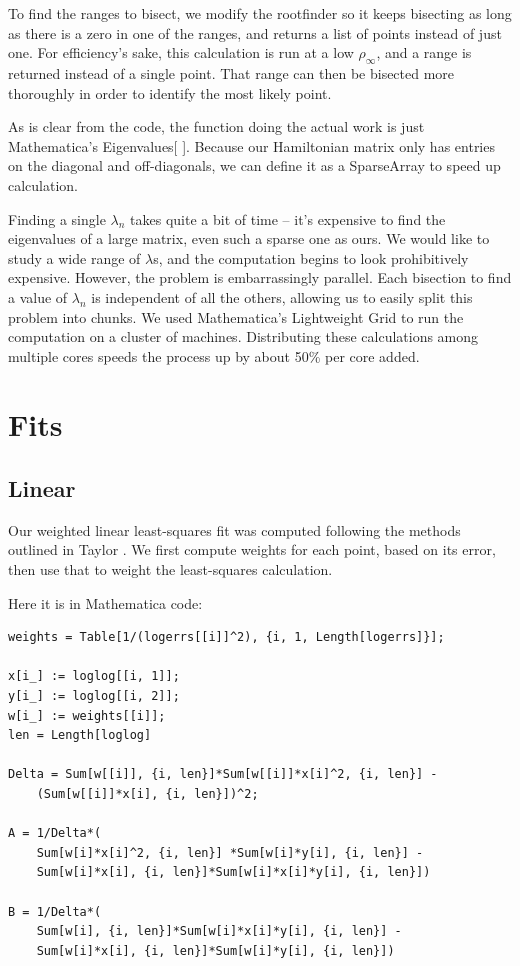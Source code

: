 \documentclass[12pt,twoside]{reedthesis}
\begin{document}
To find the ranges to bisect, we modify the rootfinder so it keeps bisecting as long as there is a zero in one of the ranges, and returns a list of points instead of just one. For efficiency's sake, this calculation is run at a low $\rho_{\infty}$, and a range is returned instead of a single point. That range can then be bisected more thoroughly in order to identify the most likely point. 

As is clear from the code, the function doing the actual work is just Mathematica's Eigenvalues[ ]. Because our Hamiltonian matrix only has entries on the diagonal and off-diagonals, we can define it as a SparseArray to speed up calculation. 

Finding a single $\lambda_{n}$ takes quite a bit of time -- it's expensive to find the eigenvalues of a large matrix, even such a sparse one as ours. We would like to study a wide range of $\lambda$s, and the computation begins to look prohibitively expensive. However, the problem is embarrassingly parallel. Each bisection to find a value of $\lambda_n$ is independent of all the others, allowing us to easily split this problem into chunks. We used Mathematica's Lightweight Grid to run the computation on a cluster of machines. Distributing these calculations among multiple cores speeds the process up by about 50\% per core added. 

\section{Fits}
\subsection{Linear}
Our weighted linear least-squares fit was computed following the methods outlined in Taylor \cite{taylor_introduction_1997}. We first compute weights for each point, based on its error, then use that to weight the least-squares calculation.

Here it is in Mathematica code:
\begin{Verbatim}
weights = Table[1/(logerrs[[i]]^2), {i, 1, Length[logerrs]}];

x[i_] := loglog[[i, 1]];
y[i_] := loglog[[i, 2]];
w[i_] := weights[[i]]; 
len = Length[loglog]

Delta = Sum[w[[i]], {i, len}]*Sum[w[[i]]*x[i]^2, {i, len}] -
	(Sum[w[[i]]*x[i], {i, len}])^2;

A = 1/Delta*(
	Sum[w[i]*x[i]^2, {i, len}] *Sum[w[i]*y[i], {i, len}] - 
	Sum[w[i]*x[i], {i, len}]*Sum[w[i]*x[i]*y[i], {i, len}])
	
B = 1/Delta*(
	Sum[w[i], {i, len}]*Sum[w[i]*x[i]*y[i], {i, len}] - 
	Sum[w[i]*x[i], {i, len}]*Sum[w[i]*y[i], {i, len}])
\end{Verbatim}
\end{document}
